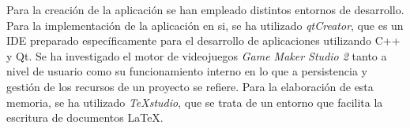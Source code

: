 Para la creación de la aplicación se han empleado distintos entornos de desarrollo.
Para la implementación de la aplicación en si, se ha utilizado \textit{qtCreator}, que es un IDE preparado específicamente para el desarrollo de aplicaciones utilizando C++ y Qt.
Se ha investigado el motor de videojuegos \textit{Game Maker Studio 2} tanto a nivel de usuario como su funcionamiento interno en lo que a persistencia y gestión de los recursos de un proyecto se refiere.
Para la elaboración de esta memoria, se ha utilizado \textit{TeXstudio}, que se trata de un entorno que facilita la escritura de documentos LaTeX.